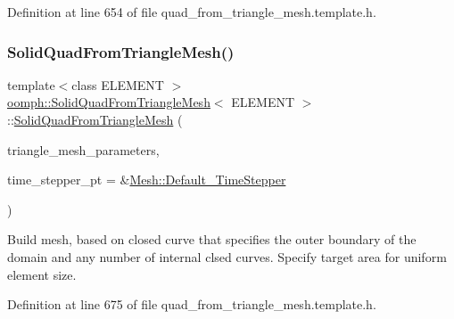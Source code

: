 Definition at line 654 of file quad\+\_\+from\+\_\+triangle\+\_\+mesh.\+template.\+h.

\mbox{\label{classoomph_1_1SolidQuadFromTriangleMesh_a2840a2b887344189d0921c9d6ff2cf63}} 
\subsubsection{\texorpdfstring{Solid\+Quad\+From\+Triangle\+Mesh()}{SolidQuadFromTriangleMesh()}\hspace{0.1cm}{\footnotesize\ttfamily [2/2]}}
{\footnotesize\ttfamily template$<$class E\+L\+E\+M\+E\+NT $>$ \\
\hyperlink{classoomph_1_1SolidQuadFromTriangleMesh}{oomph\+::\+Solid\+Quad\+From\+Triangle\+Mesh}$<$ E\+L\+E\+M\+E\+NT $>$\+::\hyperlink{classoomph_1_1SolidQuadFromTriangleMesh}{Solid\+Quad\+From\+Triangle\+Mesh} (\begin{DoxyParamCaption}\item[{\hyperlink{classoomph_1_1TriangleMeshParameters}{Triangle\+Mesh\+Parameters} \&}]{triangle\+\_\+mesh\+\_\+parameters,  }\item[{\hyperlink{classoomph_1_1TimeStepper}{Time\+Stepper} $\ast$}]{time\+\_\+stepper\+\_\+pt = {\ttfamily \&\hyperlink{classoomph_1_1Mesh_a12243d0fee2b1fcee729ee5a4777ea10}{Mesh\+::\+Default\+\_\+\+Time\+Stepper}} }\end{DoxyParamCaption})\hspace{0.3cm}{\ttfamily [inline]}}



Build mesh, based on closed curve that specifies the outer boundary of the domain and any number of internal clsed curves. Specify target area for uniform element size. 



Definition at line 675 of file quad\+\_\+from\+\_\+triangle\+\_\+mesh.\+template.\+h.

\mbox{\label{classoomph_1_1SolidQuadFromTriangleMesh_af9aaccc5a15dfefab81b91b059217aa3}} 
